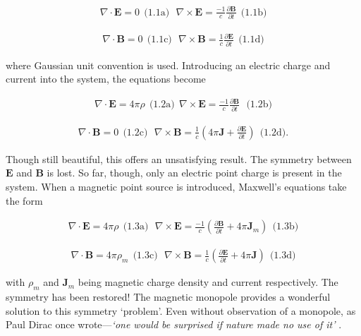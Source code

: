 \documentclass[fleqn, twocolumn, 10pt]{article}
\begin{document}
\begin{ceqn}
\begin{align*}
\nabla \cdotp \mathbf{E} = 0   \ \ \text{(1.1a)} \ \ \ \nabla \times \mathbf{E} = \frac{-1}{c}\frac{\partial \mathbf{B}}{\partial t} \ \  \text{(1.1b)}
\end{align*}
\end{ceqn}
\begin{ceqn}
\begin{align*}
\nabla \cdotp \mathbf{B} = 0   \ \ \text{(1.1c)} \ \ \ \nabla \times \mathbf{B} = \frac{1}{c} \frac{\partial \mathbf{E}}{\partial t} \ \ \text{(1.1d)}
\end{align*}
\end{ceqn}
where Gaussian unit convention is used. Introducing an electric charge and current into the system, the equations become \cite{maxwell1861li, martin2015phys}
\begin{ceqn}
\begin{align*}
\nabla \cdotp \mathbf{E} = 4\pi\rho \ \ \text{(1.2a)} \ \ \nabla \times \mathbf{E} = \frac{-1}{c}\frac{\partial \mathbf{B}}{\partial t} \ \ \ \text{(1.2b)}
\end{align*}
\end{ceqn}
\begin{ceqn}
\begin{align*}
\nabla \cdotp \mathbf{B} = 0   \ \ \text{(1.2c)} \ \ \ \nabla \times \mathbf{B} = \frac{1}{c}\left(4\pi\mathbf{J} + \frac{\partial \mathbf{E}}{\partial t}\right) \ \ \text{(1.2d)}\text{.} 
\end{align*}
\end{ceqn}
Though still beautiful, this offers an unsatisfying result. The symmetry between $\mathbf{E}$ and $\mathbf{B}$ is lost. So far, though, only an electric point charge is present in the system. When a magnetic point source is introduced, Maxwell's equations take the form \cite{ellismagnetic}
\begin{ceqn}
\begin{align*}
\nabla \cdotp \mathbf{E} = 4\pi\rho  \ \ \text{(1.3a)} \ \ \ \nabla \times \mathbf{E} = \frac{-1}{c}\left(\frac{\partial \mathbf{B}}{\partial t} + 4\pi\mathbf{J}_{m}\right) \ \  \text{(1.3b)}
\end{align*}
\end{ceqn}
\begin{ceqn}
\begin{align*}
\nabla \cdotp \mathbf{B} = 4\pi\rho_{m}  \ \ \text{(1.3c)} \ \ \ \nabla \times \mathbf{B} = \frac{1}{c}\left(\frac{\partial \mathbf{E}}{\partial t} + 4\pi\mathbf{J}\right) \ \ \text{(1.3d)}   
\end{align*}
\end{ceqn}
with $\rho_{m}$ and $\mathbf{J}_{m}$ being magnetic charge density and current respectively. The symmetry has been restored! The magnetic monopole provides a wonderful solution to this symmetry `problem'. Even without observation of a monopole, as Paul Dirac once wrote---\textit{`one would be surprised if nature made no use of it'} \cite{dirac1931quantised, arcidiacono1978tachyons}.
\end{document}
